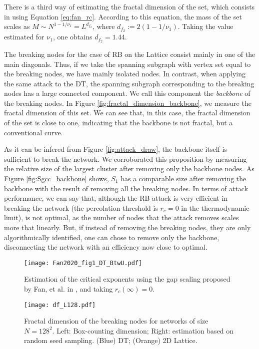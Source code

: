 \documentclass{article}
\begin{document}
There is a third way of estimating the fractal dimension of the set, which consists in using Equation \ref{eq:fan_rc}. According to this equation, the mass of the set scales as $M\sim N^{1-1/\nu_1} = L^{d_{f_2}}$, where $d_{f_2} := 2(1-1/\nu_1)$. Taking the value estimated for $\nu_1$, one obtains $d_{f_2} = 1.44$.

The breaking nodes for the case of RB on the Lattice consist mainly in one of the main diagonals. Thus, if we take the spanning subgraph with vertex set equal to the breaking nodes, we have mainly isolated nodes. In contrast, when applying the same attack to the DT, the spanning subgraph corresponding to the breaking nodes has a large connected component. We call this component the \emph{backbone} of the breaking nodes. In Figure \ref{fig:fractal_dimension_backbone}, we measure the fractal dimension of this set. We can see that, in this case, the fractal dimension of the set is close to one, indicating that the backbone is not fractal, but a conventional curve. 

As it can be infered from Figure \ref{fig:attack_draw}, the backbone itself is sufficient to break the network. We corroborated this proposition by measuring the relative size of the largest cluster after removing only the backbone nodes. As Figure \ref{fig:Sgcc_backbone} shows, $S_1$ has a comparable size after removing the backbone with the result of removing all the breaking nodes. 
In terms of attack performance, we can say that, although the RB attack is very efficient in breaking the network (the percolation threshold is $r_c = 0$ in the thermodynamic limit), is not optimal, as the number of nodes that the attack removes scales more that linearly. But, if instead of removing the breaking nodes, they are only algorithmically identified, one can chose to remove only the backbone, disconnecting the network with an efficiency now close to optimal.


\begin{figure}
\centering
\texttt{[image: Fan2020\_fig1\_DT\_BtwU.pdf]}
\caption{\label{fig:gap_exponents} Estimation of the critical exponents using the gap scaling proposed by Fan, et al. in \cite{Fan2020}, and taking $r_c(\infty) = 0$. }
\end{figure}

\begin{figure}
\centering
\texttt{[image: df\_L128.pdf]}
\caption{\label{fig:fractal_dimension} Fractal dimension of the breaking nodes for networks of size $N=128^2$. Left: Box-counting dimension; Right: estimation based on random seed sampling. (Blue) DT; (Orange) 2D Lattice.}
\end{figure}
\end{document}
